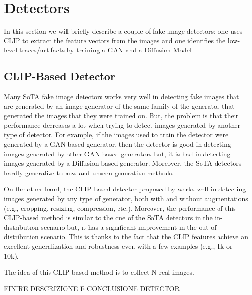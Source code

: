 \documentclass[conference]{IEEEtran} %
\begin{document}
\section{Detectors}

    In this section we will briefly describe a couple of fake image detectors: one uses CLIP to extract the feature vectors from the images \cite{cozzolino2024raising} and one identifies the low-level traces/artifacts by training a GAN and a Diffusion Model \cite{corvi2023detection}.

    \subsection{CLIP-Based Detector}
        Many SoTA fake image detectors works very well in detecting fake images that are generated by an image generator of the same family of the generator that generated the images that they were trained on. But, the problem is that their performance decreases a lot when trying to detect images generated by another type of detector. For example, if the images used to train the detector were generated by a GAN-based generator, then the detector is good in detecting images generated by other GAN-based generators but, it is bad in detecting images generated by a Diffusion-based generator. Moreover, the SoTA detectors hardly generalize to new and unseen generative methods.

        On the other hand, the CLIP-based detector proposed by \cite{cozzolino2024raising} works well in detecting images generated by any type of generator, both with and without augmentations (e.g., cropping, resizing, compression, etc.). Moreover, the performance of this CLIP-based method is similar to the one of the SoTA detectors in the in-distribution scenario but, it has a significant improvement in the out-of-distribution scenario. This is thanks to the fact that the CLIP features achieve an excellent generalization and robustness even with a few examples (e.g., 1k or 10k).

        The idea of this CLIP-based method is to collect N real images.
        
        FINIRE DESCRIZIONE E CONCLUSIONE DETECTOR


\end{document}
